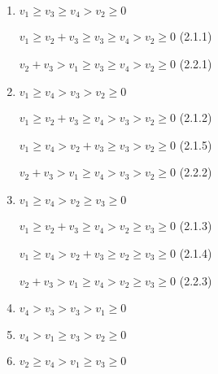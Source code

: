 \documentclass{article}
\begin{document}
\begin{enumerate}
    \item $v_1\geq{v_3}\geq{v_4}>v_2\geq{0}$

$v_1\geq{v_2+v_3}\geq{v_3}\geq{v_4}>v_2\geq{0}$ (2.1.1)

$v_2+v_3>v_1\geq{v_3}\geq{v_4}>v_2\geq{0}$ (2.2.1)
\item $v_1\geq{v_4}>v_3>v_2\geq{0}$

    $v_1\geq{v_2+v_3}\geq{v_4}>v_3>v_2\geq{0}$ (2.1.2)

    $v_1\geq{v_4}>v_2+v_3\geq{v_3}>v_2\geq{0}$ (2.1.5)

    $v_2+v_3>v_1\geq{v_4}>v_3>v_2\geq{0}$ (2.2.2)
    \item $v_1\geq{v_4}>v_2\geq{v_3}\geq{0}$

    $v_1\geq{v_2+v_3}\geq{v_4}>v_2\geq{v_3}\geq{0}$ (2.1.3)

    $v_1\geq{v_4}>v_2+v_3\geq{v_2}\geq{v_3}\geq{0}$ (2.1.4)

    $v_2+v_3>v_1\geq{v_4}>v_2\geq{v_3}\geq{0}$ (2.2.3)
    \item $v_4>v_3>v_3>v_1\geq{0}$

    \item $v_4>v_1\geq{v_3}>v_2\geq{0}$

    \item $v_2\geq{v_4}>v_1\geq{v_3}\geq{0}$

    

    
\end{enumerate}
\end{document}
